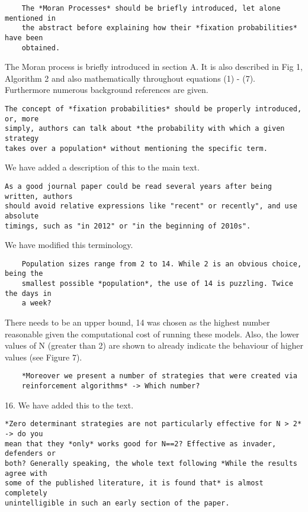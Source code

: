 \documentclass[a4]{article}
\begin{document}
\begin{verbatim}
    The *Moran Processes* should be briefly introduced, let alone mentioned in
    the abstract before explaining how their *fixation probabilities* have been
    obtained.
\end{verbatim}

The Moran process is briefly introduced in section A. It is also described in
Fig 1, Algorithm 2 and also mathematically throughout equations (1) - (7).
Furthermore numerous background references are given.

\begin{verbatim}
The concept of *fixation probabilities* should be properly introduced, or, more
simply, authors can talk about *the probability with which a given strategy
takes over a population* without mentioning the specific term.
\end{verbatim}

We have added a description of this to the main text.

\begin{verbatim}
As a good journal paper could be read several years after being written, authors
should avoid relative expressions like "recent" or recently", and use absolute
timings, such as "in 2012" or "in the beginning of 2010s".
\end{verbatim}

We have modified this terminology.

\begin{verbatim}
    Population sizes range from 2 to 14. While 2 is an obvious choice, being the
    smallest possible *population*, the use of 14 is puzzling. Twice the days in
    a week?
\end{verbatim}

There needs to be an upper bound, 14 was chosen as the highest number
reasonable given the computational cost of running these models. Also, the
lower values of N (greater than 2) are shown to already indicate the behaviour
of higher values (see Figure 7).

\begin{verbatim}
    *Moreover we present a number of strategies that were created via
    reinforcement algorithms* -> Which number?
\end{verbatim}

16. We have added this to the text.

\begin{verbatim}
*Zero determinant strategies are not particularly effective for N > 2* -> do you
mean that they *only* works good for N==2? Effective as invader, defenders or
both? Generally speaking, the whole text following *While the results agree with
some of the published literature, it is found that* is almost completely
unintelligible in such an early section of the paper.
\end{verbatim}
\end{document}
